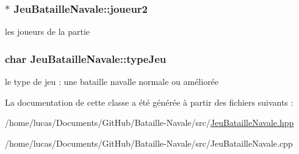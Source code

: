 \subsubsection[{\texorpdfstring{joueur2}{joueur2}}]{ $\ast$ Jeu\+Bataille\+Navale\+::joueur2\hspace{0.3cm}{\ttfamily [private]}}\hypertarget{class_jeu_bataille_navale_a8f8d8306d7101c44006a7a27a74ab640}{}\label{class_jeu_bataille_navale_a8f8d8306d7101c44006a7a27a74ab640}
les joueurs de la partie 
\subsubsection[{\texorpdfstring{type\+Jeu}{typeJeu}}]{\setlength{\rightskip}{0pt plus 5cm}char Jeu\+Bataille\+Navale\+::type\+Jeu\hspace{0.3cm}{\ttfamily [private]}}\hypertarget{class_jeu_bataille_navale_abac1f29d41caf119a9766f323506dbe0}{}\label{class_jeu_bataille_navale_abac1f29d41caf119a9766f323506dbe0}
le type de jeu \+: une bataille navalle normale ou améliorée 

La documentation de cette classe a été générée à partir des fichiers suivants \+:\begin{DoxyCompactItemize}
\item 
/home/lucas/\+Documents/\+Git\+Hub/\+Bataille-\/\+Navale/src/\hyperlink{_jeu_bataille_navale_8hpp}{Jeu\+Bataille\+Navale.\+hpp}\item 
/home/lucas/\+Documents/\+Git\+Hub/\+Bataille-\/\+Navale/src/Jeu\+Bataille\+Navale.\+cpp\end{DoxyCompactItemize}
